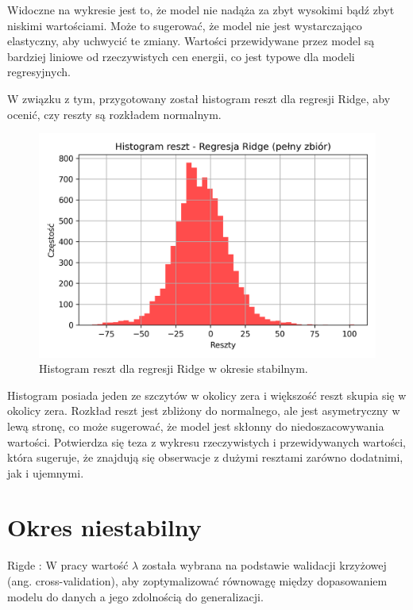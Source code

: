 Widoczne na wykresie jest to, że model nie nadąża za zbyt wysokimi bądź zbyt niskimi wartościami. Może to sugerować, że model nie jest wystarczająco elastyczny, aby uchwycić te zmiany. Wartości przewidywane przez model są bardziej liniowe od rzeczywistych cen energii, co jest typowe dla modeli regresyjnych.

W związku z tym, przygotowany został histogram reszt dla regresji Ridge, aby ocenić, czy reszty są rozkładem normalnym. 

\begin{figure}[H]
    \centering
    \includegraphics[width=1.0\textwidth]{../../plots/predicts/residuals_histogram_Ridge_full_stable_period.png}
    \caption{Histogram reszt dla regresji Ridge w okresie stabilnym.}
    \label{fig:ridge_residuals_full_stable_period}
\end{figure}

Histogram posiada jeden ze szczytów w okolicy zera i większość reszt skupia się w okolicy zera. Rozkład reszt jest zbliżony do normalnego, ale jest asymetryczny w lewą stronę, co może sugerować, że model jest skłonny do niedoszacowywania wartości. Potwierdza się teza z wykresu rzeczywistych i przewidywanych wartości, która sugeruje, że znajdują się obserwacje z dużymi resztami zarówno dodatnimi, jak i ujemnymi.

\section{Okres niestabilny}
\label{sec:okres_niestabilny}

Rigde : W pracy wartość \( \lambda \) została wybrana na podstawie walidacji krzyżowej (ang. cross-validation), aby zoptymalizować równowagę między dopasowaniem modelu do danych a jego zdolnością do generalizacji.